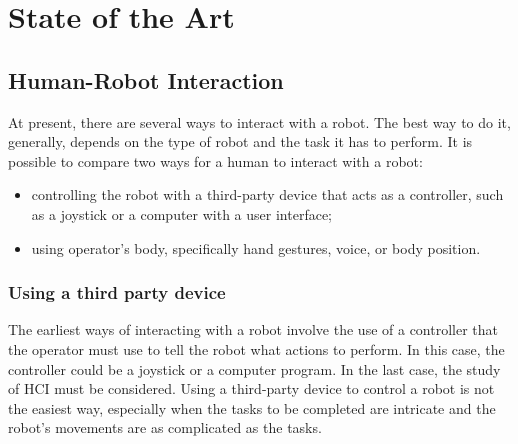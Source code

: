\documentclass[../thesis.tex]{subfiles}
\begin{document}
\chapter{State of the Art}\label{cap:theory}

\section{Human-Robot Interaction}
At present, there are several ways to interact with a robot. The best way to do it, generally, depends on the type of robot and the task it has to perform. It is possible to compare two ways for a human to interact with a robot:
\begin{itemize}
    \item controlling the robot with a third-party device that acts as a controller, such as a joystick or a computer with a user interface;
    \item using operator's body, specifically hand gestures, voice, or body position.
\end{itemize}
\subsection{Using a third party device}
The earliest ways of interacting with a robot involve the use of a controller that the operator must use to tell the robot what actions to perform. In this case, the controller could be a joystick or a computer program. In the last case, the study of \acrfull{HCI} must be considered. Using a third-party device to control a robot is not the easiest way, especially when the tasks to be completed are intricate and the robot’s movements are as complicated as the tasks.
\end{document}
